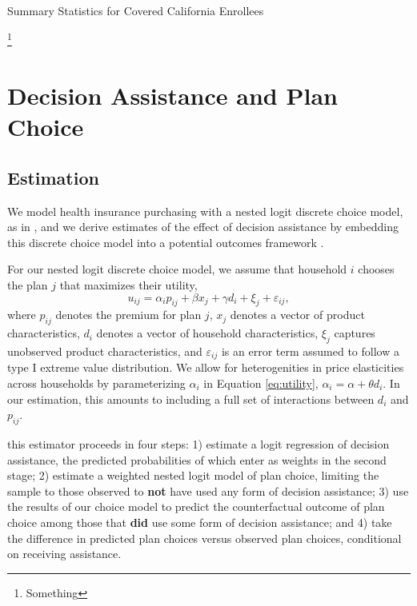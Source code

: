 \documentclass[12pt]{article}
\begin{document}
\begin{table}[h]
\centering	
\caption{Summary Statistics for Covered California Enrollees}

\footnote{Something}
\label{tab:summary-stats}
\end{table}


\section{Decision Assistance and Plan Choice}
\label{sec:causal}

\subsection{Estimation}
\label{subsec:causal-methods}
We model health insurance purchasing with a nested logit discrete choice model, as in \cite{saltzman2019}, and we derive estimates of the effect of decision assistance by embedding this discrete choice model into a potential outcomes framework \citep{rubin1974, imbens2009}.

For our nested logit discrete choice model, we assume that household $i$ chooses the plan $j$ that maximizes their utility,
\begin{equation}
u_{ij} = \alpha_{i}p_{ij} + \beta x_{j} + \gamma d_{i} + \xi_{j} + \varepsilon_{ij}, \label{eq:utility}
\end{equation}
where $p_{ij}$ denotes the premium for plan $j$, $x_{j}$ denotes a vector of product characteristics, $d_{i}$ denotes a vector of household characteristics, $\xi_{j}$ captures unobserved product characteristics, and $\varepsilon_{ij}$ is an error term assumed to follow a type I extreme value distribution. We allow for heterogenities in price elasticities across households by parameterizing $\alpha_{i}$ in Equation \eqref{eq:utility}, $\alpha_{i} = \alpha + \theta d_{i}.$ In our estimation, this amounts to including a full set of interactions between $d_{i}$ and $p_{ij}$.

this estimator proceeds in four steps: 1) estimate a logit regression of decision assistance, the predicted probabilities of which enter as weights in the second stage; 2) estimate a weighted nested logit model of plan choice, limiting the sample to those observed to \textbf{not} have used any form of decision assistance; 3) use the results of our choice model to predict the counterfactual outcome of plan choice among those that \textbf{did} use some form of decision assistance; and 4) take the difference in predicted plan choices versus observed plan choices, conditional on receiving assistance. 
\end{document}
